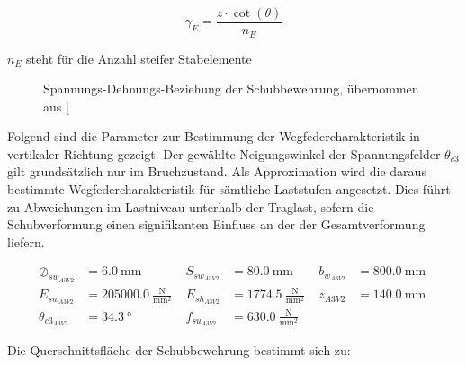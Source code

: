 \documentclass[
  11pt,
  letterpaper,
]{scrreprt}
\begin{document}
\[
\gamma_{E} = \frac{z \cdot \cot(\theta)}{n_{E}}
\]

\(n_{E}\) steht für die Anzahl steifer Stabelemente

\begin{figure}[H]


\caption{\label{fig-sigma-eps-a3v2}Spannungs-Dehnungs-Beziehung der
Schubbewehrung, übernommen aus
{[}\citeproc{ref-gitz_ansatze_2024}{1}{]}}

\end{figure}%

Folgend sind die Parameter zur Bestimmung der Wegfedercharakteristik in
vertikaler Richtung gezeigt. Der gewählte Neigungswinkel der
Spannungsfelder \(\theta_{c3}\) gilt grundsätzlich nur im Bruchzustand.
Als Approximation wird die daraus bestimmte Wegfedercharakteristik für
sämtliche Laststufen angesetzt. Dies führt zu Abweichungen im Lastniveau
unterhalb der Traglast, sofern die Schubverformung einen signifikanten
Einfluss an der der Gesamtverformung liefern.

$$
\begin{aligned}
\oslash_{sw_{A3V2}} &= 6.0\ \mathrm{mm} \; 
 &S_{sw_{A3V2}} &= 80.0\ \mathrm{mm} \; 
 &b_{w_{A3V2}} &= 800.0\ \mathrm{mm} \; 
\\[11pt]
 E_{sw_{A3V2}} &= 205000.0\ \frac{\mathrm{N}}{\mathrm{mm}^{2}} \; 
 &E_{sh_{A3V2}} &= 1774.5\ \frac{\mathrm{N}}{\mathrm{mm}^{2}} \; 
 &z_{A3V2} &= 140.0\ \mathrm{mm} \; 
\\[11pt]
 \theta_{c3_{A3V2}} &= 34.3\ \mathrm{°} \; 
 &f_{su_{A3V2}} &= 630.0\ \frac{\mathrm{N}}{\mathrm{mm}^{2}} \;
\end{aligned}
$$

Die Querschnittsfläche der Schubbewehrung bestimmt sich zu:
\end{document}
